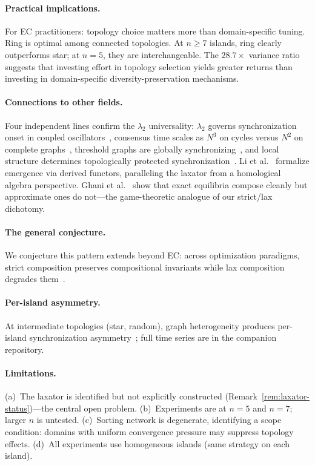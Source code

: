 \documentclass[submission,copyright,creativecommons]{eptcs}
\begin{document}
\paragraph{Practical implications.}
For EC practitioners: topology choice matters more than
domain-specific tuning. Ring is optimal among connected topologies.
At $n \geq 7$ islands, ring clearly outperforms star; at $n{=}5$,
they are interchangeable. The $28.7\times$ variance ratio suggests
that investing effort in topology selection yields greater returns
than investing in domain-specific diversity-preservation mechanisms.

\paragraph{Connections to other fields.}
Four independent lines confirm the $\lambda_2$ universality:
$\lambda_2$ governs synchronization onset in coupled
oscillators~\cite{sanz2026algebraic}, consensus time scales as
$N^3$ on cycles versus $N^2$ on complete
graphs~\cite{brewster2025diversity}, threshold graphs are globally
synchronizing~\cite{wu2025threshold}, and local structure determines
topologically protected
synchronization~\cite{ostilli2025topological}. Li et
al.~\cite{li2023emergence} formalize emergence via derived functors,
paralleling the laxator from a homological algebra perspective.
Ghani et al.~\cite{ghani2025approximate} show that exact equilibria
compose cleanly but approximate ones do not---the game-theoretic
analogue of our strict/lax dichotomy.

\paragraph{The general conjecture.}
We conjecture this pattern extends beyond EC: across optimization
paradigms, strict composition preserves compositional invariants while
lax composition degrades
them~\cite{chen2025scaling,kumar2026constitutional,
alphaevolve2026marl,alpay2025semantic,assumpcao2025codeevolve,
sanz2026algebraic,han2026conformity}.

\paragraph{Per-island asymmetry.}
At intermediate topologies (star, random), graph heterogeneity
produces per-island synchronization
asymmetry~\cite{zhou2026defect}; full time series are in the
companion repository.

\paragraph{Limitations.}
(a)~The laxator is identified but not explicitly constructed
(Remark~\ref{rem:laxator-status})---the central open problem.
(b)~Experiments are at $n{=}5$ and $n{=}7$; larger $n$ is
untested.
(c)~Sorting network is degenerate, identifying a scope condition:
domains with uniform convergence pressure may suppress topology
effects.
(d)~All experiments use homogeneous islands (same strategy on each
island).
\end{document}

